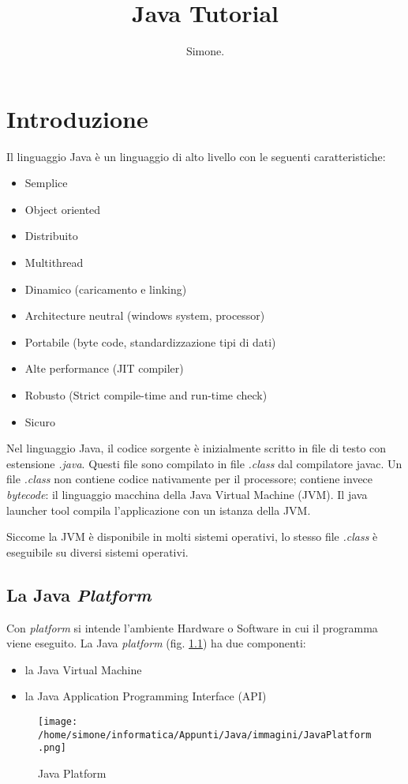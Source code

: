 \documentclass[a4paper,12pt,twoside]{book}
\author{Simone.}
\title{Java Tutorial}
\begin{document}
\maketitle

\newpage

\tableofcontents

\newpage
\chapter{Introduzione}
Il linguaggio Java è un linguaggio di alto livello con le seguenti
caratteristiche:
\begin{itemize}
\item Semplice
\item Object oriented
\item Distribuito
\item Multithread
\item Dinamico (caricamento e linking)
\item Architecture neutral (windows system, processor)
\item Portabile (byte code, standardizzazione tipi di dati)
\item Alte performance (JIT compiler)
\item Robusto (Strict compile-time and run-time check)
\item Sicuro
\end{itemize}
Nel linguaggio Java, il codice sorgente è inizialmente scritto in file
di testo con estensione \emph{.java}. Questi file sono compilato in
file \emph{.class} dal compilatore javac. Un file \emph{.class} non
contiene codice nativamente per il processore; contiene invece
\emph{bytecode}: il linguaggio macchina della Java Virtual Machine
(JVM). Il java launcher tool compila l'applicazione con un istanza
della JVM.

Siccome la JVM è disponibile in molti sistemi operativi, lo stesso
file \emph{.class} è eseguibile su diversi sistemi operativi.

\section{La Java \emph{Platform}}
Con \emph{platform} si intende l'ambiente Hardware o Software in cui
il programma viene eseguito. La Java \emph{platform}
(fig. \ref{fig:JP}) ha due componenti:
\begin{itemize}
\item la Java Virtual Machine
\item la Java Application Programming Interface (API)
\end{itemize}
\begin{figure}
  \centering
  \texttt{[image: /home/simone/informatica/Appunti/Java/immagini/JavaPlatform.png]}
  \caption{Java Platform \label{fig:JP}}
\end{figure}
\end{document}

